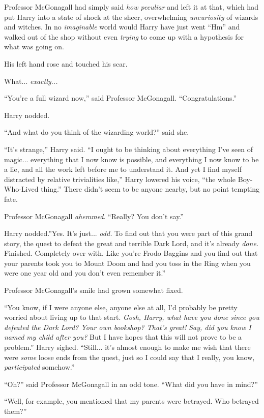 Professor McGonagall had simply said \emph{how peculiar} and left it at
that, which had put Harry into a state of shock at the sheer,
overwhelming \emph{uncuriosity} of wizards and witches. In no
\emph{imaginable} world would Harry have just went ``Hm'' and walked out
of the shop without even \emph{trying} to come up with a hypothesis for
what was going on.

His left hand rose and touched his scar.

What... \emph{exactly...}

``You're a full wizard now,'' said Professor McGonagall.
``Congratulations.''

Harry nodded.

``And what do you think of the wizarding world?'' said she.

``It's strange,'' Harry said. ``I ought to be thinking about everything
I've seen of magic... everything that I now know is possible, and
everything I now know to be a lie, and all the work left before me to
understand it. And yet I find myself distracted by relative trivialities
like,'' Harry lowered his voice, ``the whole Boy-Who-Lived thing.''
There didn't seem to be anyone nearby, but no point tempting fate.

Professor McGonagall \emph{ahemmed}. ``Really? You don't say.''

Harry nodded.''Yes. It's just... \emph{odd.} To find out that you
were part of this grand story, the quest to defeat the great and
terrible Dark Lord, and it's already \emph{done.} Finished. Completely
over with. Like you're Frodo Baggins and you find out that your parents
took you to Mount Doom and had you toss in the Ring when you were one
year old and you don't even remember it.''

Professor McGonagall's smile had grown somewhat fixed.

``You know, if I were anyone else, anyone else at all, I'd probably be
pretty worried about living up to that start. \emph{Gosh, Harry, what
have you done since you defeated the Dark Lord? Your own bookshop?
That's great! Say, did you know I named my child after you?} But I have
hopes that this will not prove to be a problem.'' Harry sighed.
``Still... it's almost enough to make me wish that there were
\emph{some} loose ends from the quest, just so I could say that I
really, you know, \emph{participated} somehow.''

``Oh?'' said Professor McGonagall in an odd tone. ``What did you have in
mind?''

``Well, for example, you mentioned that my parents were betrayed. Who
betrayed them?''


